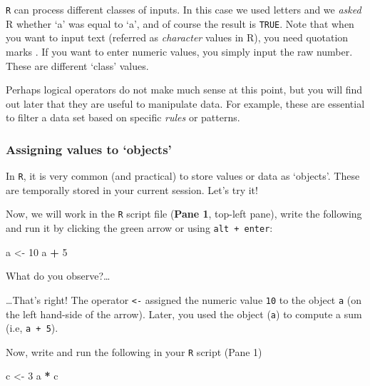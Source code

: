 \documentclass[
]{book}
\newenvironment{Shaded}{\begin{snugshade}}{\end{snugshade}}
\newcommand{\DecValTok}[1]{\textcolor[rgb]{0.00,0.00,0.81}{#1}}
\newcommand{\NormalTok}[1]{#1}
\newcommand{\OtherTok}[1]{\textcolor[rgb]{0.56,0.35,0.01}{#1}}
\newcommand{\SpecialCharTok}[1]{\textcolor[rgb]{0.81,0.36,0.00}{\textbf{#1}}}
\begin{document}
\texttt{R} can process different classes of inputs. In this case we used letters and we \emph{asked} R whether `a' was equal to `a', and of course the result is \texttt{TRUE}. Note that when you want to input text (referred as \emph{character} values in R), you need quotation marks \texttt{\textquotesingle{}}. If you want to enter numeric values, you simply input the raw number. These are different `class' values.

Perhaps logical operators do not make much sense at this point, but you will find out later that they are useful to manipulate data. For example, these are essential to filter a data set based on specific \emph{rules} or patterns.

\hypertarget{assigning-values-to-objects}{%
\subsubsection{Assigning values to `objects'}\label{assigning-values-to-objects}}

In \texttt{R}, it is very common (and practical) to store values or data as `objects'. These are temporally stored in your current session. Let's try it!

Now, we will work in the \texttt{R} script file (\textbf{Pane 1}, top-left pane), write the following and run it by clicking the green arrow or using \texttt{alt\ +\ enter}:

\begin{Shaded}
\begin{Highlighting}[]
\NormalTok{a }\OtherTok{\textless{}{-}} \DecValTok{10}
\NormalTok{a }\SpecialCharTok{+} \DecValTok{5}
\end{Highlighting}
\end{Shaded}

What do you observe?\ldots{}

\ldots That's right! The operator \texttt{\textless{}-} assigned the numeric value \texttt{10} to the object \texttt{a} (on the left hand-side of the arrow). Later, you used the object (\texttt{a}) to compute a sum (i.e, \texttt{a\ +\ 5}).

Now, write and run the following in your \texttt{R} script (Pane 1)

\begin{Shaded}
\begin{Highlighting}[]
\NormalTok{c }\OtherTok{\textless{}{-}} \DecValTok{3}
\NormalTok{a  }\SpecialCharTok{*}\NormalTok{  c}
\end{Highlighting}
\end{Shaded}
\end{document}
